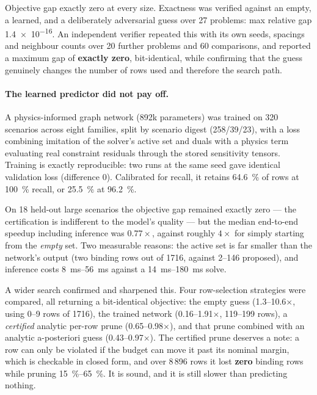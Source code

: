 Objective gap exactly zero at every size. Exactness was verified against an
empty, a learned, and a deliberately adversarial guess over 27 problems: max
relative gap \num{1.4e-16}. An independent verifier repeated this with its own
seeds, spacings and neighbour counts over 20 further problems and 60
comparisons, and reported a maximum gap of \textbf{exactly zero}, bit-identical,
while confirming that the guess genuinely changes the number of rows used and
therefore the search path.

\paragraph{The learned predictor did not pay off.} A physics-informed graph
network (\num{892}k parameters) was trained on 320 scenarios across eight
families, split by scenario digest (258/39/23), with a loss combining
imitation of the solver's active set and duals with a physics term evaluating
real constraint residuals through the stored sensitivity tensors. Training is
exactly reproducible: two runs at the same seed gave identical validation loss
(difference \num{0}). Calibrated for recall, it retains \SI{64.6}{\percent} of
rows at \SI{100}{\percent} recall, or \SI{25.5}{\percent} at
\SI{96.2}{\percent}.

On 18 held-out large scenarios the objective gap remained exactly zero --- the
certification is indifferent to the model's quality --- but the median
end-to-end speedup including inference was $0.77\times$, against roughly
$4\times$ for simply starting from the \emph{empty} set. Two measurable
reasons: the active set is far smaller than the network's output (two binding
rows out of 1716, against 2--146 proposed), and inference costs
\SIrange{8}{56}{\milli\second} against a \SIrange{14}{180}{\milli\second}
solve.

A wider search confirmed and sharpened this. Four row-selection strategies were
compared, all returning a bit-identical objective: the empty guess
(\numrange{1.3}{10.6}$\times$, using 0--9 rows of 1716), the trained network
(\numrange{0.16}{1.91}$\times$, 119--199 rows), a \emph{certified} analytic
per-row prune (\numrange{0.65}{0.98}$\times$), and that prune combined with an
analytic a-posteriori guess (\numrange{0.43}{0.97}$\times$). The certified prune
deserves a note: a row can only be violated if the budget can move it past its
nominal margin, which is checkable in closed form, and over 8\,896 rows it lost
\textbf{zero} binding rows while pruning \SIrange{15}{65}{\percent}. It is
sound, and it is still slower than predicting nothing.

